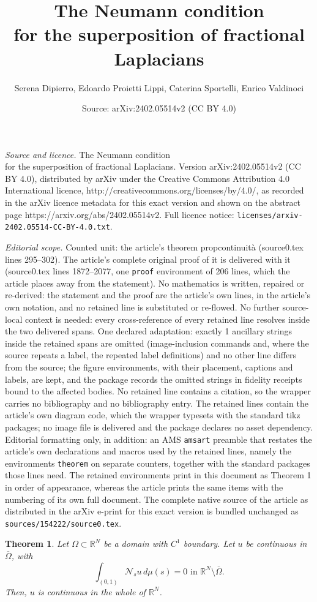 \documentclass[10pt,a4paper]{amsart}
\title{The Neumann condition\\ for the superposition of fractional Laplacians}
\author{Serena Dipierro, Edoardo Proietti Lippi, Caterina Sportelli, Enrico Valdinoci}
\date{Source: arXiv:2402.05514v2 (CC BY 4.0)}
\newtheorem{theorem}{Theorem}
\def \Ns {\mathscr{N}_{s}}
\def \R {\mathbb{R}}
\begin{document}
\maketitle

\noindent\emph{Source and licence.} The Neumann condition\\ for the superposition of fractional Laplacians. Version arXiv:2402.05514v2 (CC BY 4.0), distributed by arXiv under the Creative Commons Attribution 4.0 International licence, http://creativecommons.org/licenses/by/4.0/, as recorded in the arXiv licence metadata for this exact version and shown on the abstract page https://arxiv.org/abs/2402.05514v2. Full licence notice: \texttt{licenses/arxiv-2402.05514-CC-BY-4.0.txt}.\par\smallskip

\noindent\textit{Editorial scope.} Counted unit: the article's theorem propcontinuità (source0.tex lines 295--302). The article's complete original proof of it is delivered with it (source0.tex lines 1872--2077, one \texttt{proof} environment of 206 lines, which the article places away from the statement). No mathematics is written, repaired or re-derived: the statement and the proof are the article's own lines, in the article's own notation, and no retained line is substituted or re-flowed.  No further source-local context is needed: every cross-reference of every retained line resolves inside the two delivered spans.  One declared adaptation: exactly 1 ancillary strings inside the retained spans are omitted (image-inclusion commands and, where the source repeats a label, the repeated label definitions) and no other line differs from the source; the figure environments, with their placement, captions and labels, are kept, and the package records the omitted strings in fidelity receipts bound to the affected bodies.  No retained line contains a citation, so the wrapper carries no bibliography and no bibliography entry.  The retained lines contain the article's own diagram code, which the wrapper typesets with the standard tikz packages; no image file is delivered and the package declares no asset dependency.  Editorial formatting only, in addition: an AMS \texttt{amsart} preamble that restates the article's own declarations and macros used by the retained lines, namely the environments \texttt{theorem} on separate counters, together with the standard packages those lines need.  The retained environments print in this document as Theorem 1 in order of appearance, whereas the article prints the same items with the numbering of its own full document.  The complete native source of the article as distributed in the arXiv e-print for this exact version is bundled unchanged as \texttt{sources/154222/source0.tex}.
\begin{theorem}\label{propcontinuità}
Let $\Omega\subset \R^N$ be a domain with $C^1$ boundary. Let 
$u$ be continuous in $\overline{\Omega}$, with 
\begin{equation}\label{NNN}
\int_{(0,1)}\Ns u\,d\mu(s)=0 \mbox{ in } \R^N\setminus \overline{\Omega}.
\end{equation}
Then, $u$ is continuous in the whole of $\R^N$.
\end{theorem}
\end{document}
